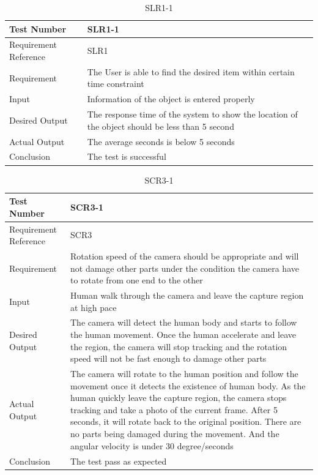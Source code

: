 \documentclass[12pt, titlepage]{article}
\begin{document}
\begin{table}[H]
\begin{center}
\begin{tabular}{|l | m{9cm}|}
\hline
  Test Number & SLR1-1\\
  \hline
  Requirement Reference & SLR1\\
  \hline
  Requirement & The User is able to find the desired item within certain time constraint\\
  \hline
  Input & Information of the object is entered properly\\
  \hline
  Desired Output & The response time of the system to show the location of the object should be less than 5 second\\
  \hline
  Actual Output & The average seconds is below 5 seconds\\
  \hline
  Conclusion & The test is successful\\
  \hline
\end{tabular}
\end{center}     
\caption{SLR1-1}
\end{table}

\begin{table}[H]
\begin{center}
\begin{tabular}{|l | m{9cm}|}
\hline
  Test Number & SCR3-1\\
  \hline
  Requirement Reference & SCR3\\
  \hline
  Requirement &  Rotation speed of the camera should be appropriate and will not damage other parts under the condition the camera have to rotate from one end to the other\\
  \hline
  Input & Human walk through the camera and leave the capture region at high pace\\
  \hline
  Desired Output & The camera will detect the human body and starts to follow the human movement. Once the human accelerate and leave the region, the camera will stop tracking and the rotation speed will not be fast enough to damage other parts\\
  \hline
  Actual Output & The camera will rotate to the human position and follow the movement once it detects the existence of human body. As the human quickly leave the capture region, the camera stops tracking and take a photo of the current frame. After 5 seconds, it will rotate back to the original position. There are no parts being damaged during the movement. And the angular velocity is under 30 degree/seconds \\
  \hline
  Conclusion & The test pass as expected\\
  \hline
\end{tabular}
\end{center}   
\caption{SCR3-1}
\end{table}
\end{document}
